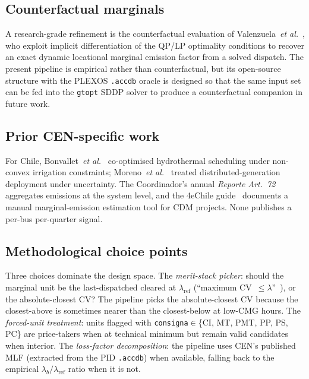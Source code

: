 \subsection{Counterfactual marginals}
A research-grade refinement is the counterfactual evaluation of
Valenzuela~\textit{et al.}~\cite{ValenzuelaASL2022}, who exploit
implicit differentiation of the QP/LP optimality conditions to
recover an exact dynamic locational marginal emission factor from a
solved dispatch.  The present pipeline is empirical rather than
counterfactual, but its open-source structure with the PLEXOS
\texttt{.accdb} oracle is designed so that the same input set can
be fed into the \texttt{gtopt} SDDP solver to produce a
counterfactual companion in future work.

\subsection{Prior CEN-specific work}
For Chile, Bonvallet~\textit{et al.}~\cite{Bonvallet2016}
co-optimised hydrothermal scheduling under non-convex irrigation
constraints; Moreno~\textit{et al.}~\cite{Moreno2014} treated
distributed-generation deployment under uncertainty.  The
Coordinador's annual \textit{Reporte Art.~72}~\cite{CENArt722024}
aggregates emissions at the system level, and the 4eChile
guide~\cite{FourEChileGuide} documents a manual marginal-emission
estimation tool for CDM projects.  None publishes a per-bus
per-quarter signal.

\subsection{Methodological choice points}
Three choices dominate the design space.  The
\emph{merit-stack picker}: should the marginal unit be the
last-dispatched cleared at $\lambda_{\mathrm{ref}}$
(``maximum CV~$\le \lambda$''~\cite{SilerEvans2012}), or the
absolute-closest CV?  The pipeline picks the absolute-closest CV
because the closest-above is sometimes nearer than the
closest-below at low-CMG hours.  The \emph{forced-unit
treatment}: units flagged with \texttt{consigna}$\in$\{CI, MT,
PMT, PP, PS, PC\} are price-takers when at technical minimum but
remain valid candidates when interior.  The \emph{loss-factor
decomposition}: the pipeline uses CEN's published MLF (extracted
from the PID \texttt{.accdb}) when available, falling back to the
empirical $\lambda_b/\lambda_{\mathrm{ref}}$ ratio when it is not.
